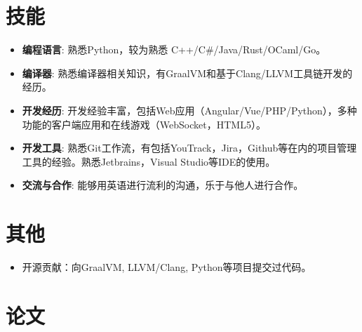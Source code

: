 \documentclass{resume}
\begin{document}


\section{技能}
\begin{itemize}[parsep=0.25ex]
  \item \textbf{编程语言}:
    熟悉Python，较为熟悉 C++/C\#/Java/Rust/OCaml/Go。

  \item \textbf{编译器}:
    熟悉编译器相关知识，有GraalVM和基于Clang/LLVM工具链开发的经历。
  
  \item \textbf{开发经历}:
    开发经验丰富，包括Web应用（Angular/Vue/PHP/Python），多种功能的客户端应用和在线游戏（WebSocket，HTML5）。
    
  \item \textbf{开发工具}:
    熟悉Git工作流，有包括YouTrack，Jira，Github等在内的项目管理工具的经验。熟悉Jetbrains，Visual Studio等IDE的使用。
  
  \item \textbf{交流与合作}:
    能够用英语进行流利的沟通，乐于与他人进行合作。
%
\end{itemize}

\section{其他}
\begin{itemize}[parsep=0.25ex]
  \item 开源贡献：向GraalVM, LLVM/Clang, Python等项目提交过代码。
\end{itemize}

\section{论文}


%
%
\end{document}
